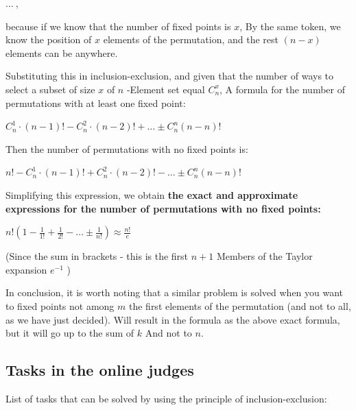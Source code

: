$\ldots ~,$

because if we know that the number of fixed points is $x$, By the same token, we know the position of $x$ elements of the permutation, and the rest $(n-x)$ elements can be anywhere.

Substituting this in inclusion-exclusion, and given that the number of ways to select a subset of size $x$ of $n$ -Element set equal $C_n ^ x$, A formula for the number of permutations with at least one fixed point:

$C_{n}^{1}\cdot(n-1)!-C_{n}^{2}\cdot(n-2)!+\ldots\pm C_{n}^{n}(n-n)!$

Then the number of permutations with no fixed points is:

$n!-C_{n}^{1}\cdot(n-1)!+C_{n}^{2}\cdot(n-2)!-\ldots\pm C_{n}^{n}(n-n)!$

Simplifying this expression, we obtain \textbf{the exact and approximate expressions for the number of permutations with no fixed points:}

$n!\left(1-\frac{1}{1!}+\frac{1}{2!}-\ldots\pm\frac{1}{n!}\right)\approx\frac{n!}{e}$

(Since the sum in brackets - this is the first $n +1$ Members of the Taylor expansion $e ^ {-1}$ )

In conclusion, it is worth noting that a similar problem is solved when you want to fixed points not among $m$ the first elements of the permutation (and not to all, as we have just decided). Will result in the formula as the above exact formula, but it will go up to the sum of $k$ And not to $n$.

\subsection{ Tasks in the online judges }

List of tasks that can be solved by using the principle of inclusion-exclusion:

